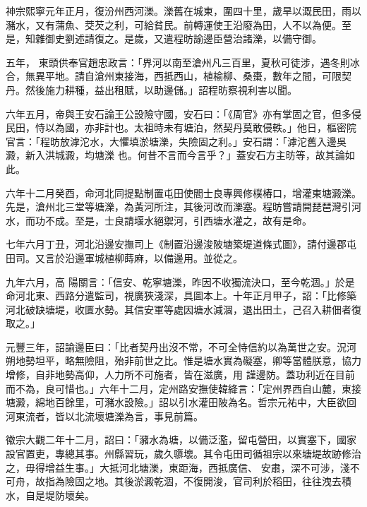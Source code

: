 \begin{pinyinscope}
 神宗熙寧元年正月，復汾州西河濼。濼舊在城東，圍四十里，歲旱以溉民田，雨以瀦水，又有蒲魚、茭芡之利，可給貧民。前轉運使王沿廢為田，人不以為便。至是，知雜御史劉述請復之。是歲，又遣程昉諭邊臣營治諸濼，以備守御。



 五年，
 東頭供奉官趙忠政言：「界河以南至滄州凡三百里，夏秋可徒涉，遇冬則冰合，無異平地。請自滄州東接海，西抵西山，植榆柳、桑棗，數年之間，可限契丹。然後施力耕種，益出租賦，以助邊儲。」詔程昉察視利害以聞。



 六年五月，帝與王安石論王公設險守國，安石曰：「《周官》亦有掌固之官，但多侵民田，恃以為國，亦非計也。太祖時未有塘泊，然契丹莫敢侵軼。」他日，樞密院官言：「程昉放滹沱水，大懼填淤塘濼，失險固之利。」安石謂：「滹沱舊入邊吳澱，新入洪城澱，均塘濼
 也。何昔不言而今言乎？」蓋安石方主昉等，故其論如此。



 六年十二月癸酉，命河北同提點制置屯田使閻士良專興修樸樁口，增灌東塘澱濼。先是，滄州北三堂等塘濼，為黃河所注，其後河改而濼塞。程昉嘗請開琵琶灣引河水，而功不成。至是，士良請堰水絕禦河，引西塘水灌之，故有是命。



 七年六月丁丑，河北沿邊安撫司上《制置沿邊浚陂塘築堤道條式圖》，請付邊郡屯田司。又言於沿邊軍城植柳蒔麻，以備邊用。並從之。



 九年六月，高
 陽關言：「信安、乾寧塘濼，昨因不收獨流決口，至今乾涸。」於是命河北東、西路分遣監司，視廣狹淺深，具圖本上。十年正月甲子，詔：「比修築河北破缺塘堤，收匱水勢。其信安軍等處因塘水減涸，退出田土，己召入耕佃者復取之。」



 元豐三年，詔諭邊臣曰：「比者契丹出沒不常，不可全恃信約以為萬世之安。況河朔地勢坦平，略無險阻，殆非前世之比。惟是塘水實為礙塞，卿等當體朕意，協力增修，自非地勢高仰，人力所不可施者，皆在滋廣，用
 謹邊防。蓋功利近在目前而不為，良可惜也。」六年十二月，定州路安撫使韓絳言：「定州界西自山麓，東接塘澱，綿地百餘里，可瀦水設險。」詔以引水灌田陂為名。哲宗元祐中，大臣欲回河東流者，皆以北流壞塘濼為言，事見前篇。



 徽宗大觀二年十二月，詔曰：「瀦水為塘，以備泛濫，留屯營田，以實塞下，國家設官置吏，專總其事。州縣習玩，歲久隳壞。其令屯田司循祖宗以來塘堤故跡修治之，毋得增益生事。」大抵河北塘濼，東距海，西抵廣信、
 安肅，深不可涉，淺不可舟，故指為險固之地。其後淤澱乾涸，不復開浚，官司利於稻田，往往洩去積水，自是堤防壞矣。




\end{pinyinscope}
